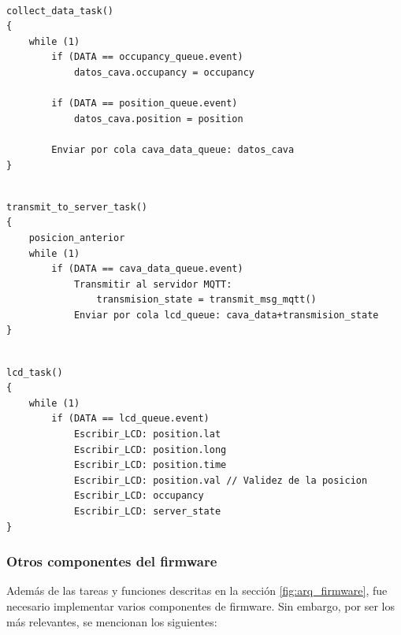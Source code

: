 \begin{lstlisting}[label=cod:collect_data_task, caption=Pseudocódigo de la función collect\_data\_task().] 

collect_data_task()
{
	while (1)
		if (DATA == occupancy_queue.event)
			datos_cava.occupancy = occupancy
			
		if (DATA == position_queue.event)
			datos_cava.position = position
		
		Enviar por cola cava_data_queue: datos_cava		
}

\end{lstlisting}

 

\begin{lstlisting}[label=cod:transmit_to_server_task, caption=Pseudocódigo de la función transmit\_to\_server\_task().] 

transmit_to_server_task()
{
	posicion_anterior
	while (1)
		if (DATA == cava_data_queue.event)
			Transmitir al servidor MQTT: 
				transmision_state = transmit_msg_mqtt()
			Enviar por cola lcd_queue: cava_data+transmision_state
}

\end{lstlisting}

 

\begin{lstlisting}[label=cod:lcd_task, caption=Pseudocódigo de la función lcd\_task().] 

lcd_task()
{
	while (1)
		if (DATA == lcd_queue.event)
			Escribir_LCD: position.lat
			Escribir_LCD: position.long
			Escribir_LCD: position.time
			Escribir_LCD: position.val // Validez de la posicion
			Escribir_LCD: occupancy
			Escribir_LCD: server_state
}

\end{lstlisting}



\subsubsection{Otros componentes del firmware}

Además de las tareas y funciones descritas en la sección \ref{fig:arq_firmware}, fue necesario implementar varios componentes de firmware. Sin embargo, por ser los más relevantes, se mencionan los siguientes:

